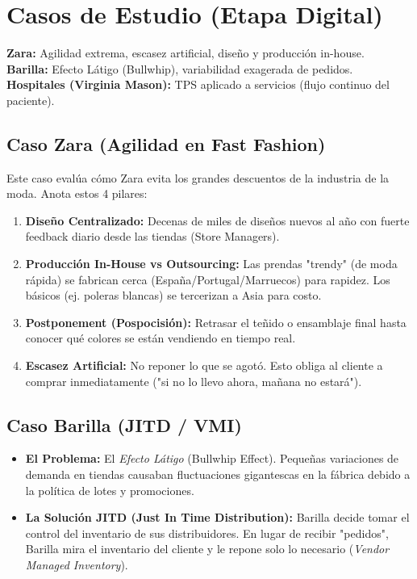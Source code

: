 \section{Casos de Estudio (Etapa Digital)}

\begin{tcolorbox}[colback=purple!5!white,colframe=purple!75!black,title=Mapa Mental Rápido (Cópialo)]
\textbf{Zara:} Agilidad extrema, escasez artificial, diseño y producción in-house.\\
\textbf{Barilla:} Efecto Látigo (Bullwhip), variabilidad exagerada de pedidos.\\
\textbf{Hospitales (Virginia Mason):} TPS aplicado a servicios (flujo continuo del paciente).
\end{tcolorbox}

\subsection{Caso Zara (Agilidad en Fast Fashion)}
Este caso evalúa cómo Zara evita los grandes descuentos de la industria de la moda. Anota estos 4 pilares:
\begin{enumerate}
    \item \textbf{Diseño Centralizado:} Decenas de miles de diseños nuevos al año con fuerte feedback diario desde las tiendas (Store Managers).
    \item \textbf{Producción In-House vs Outsourcing:} Las prendas "trendy" (de moda rápida) se fabrican cerca (España/Portugal/Marruecos) para rapidez. Los básicos (ej. poleras blancas) se tercerizan a Asia para costo.
    \item \textbf{Postponement (Pospocisión):} Retrasar el teñido o ensamblaje final hasta conocer qué colores se están vendiendo en tiempo real.
    \item \textbf{Escasez Artificial:} No reponer lo que se agotó. Esto obliga al cliente a comprar inmediatamente ("si no lo llevo ahora, mañana no estará").
\end{enumerate}

\subsection{Caso Barilla (JITD / VMI)}
\begin{itemize}[itemsep=1ex]
    \item \textbf{El Problema:} El \textit{Efecto Látigo} (Bullwhip Effect). Pequeñas variaciones de demanda en tiendas causaban fluctuaciones gigantescas en la fábrica debido a la política de lotes y promociones.
    \item \textbf{La Solución JITD (Just In Time Distribution):} Barilla decide tomar el control del inventario de sus distribuidores. En lugar de recibir "pedidos", Barilla mira el inventario del cliente y le repone solo lo necesario (\textit{Vendor Managed Inventory}).
\end{itemize}

